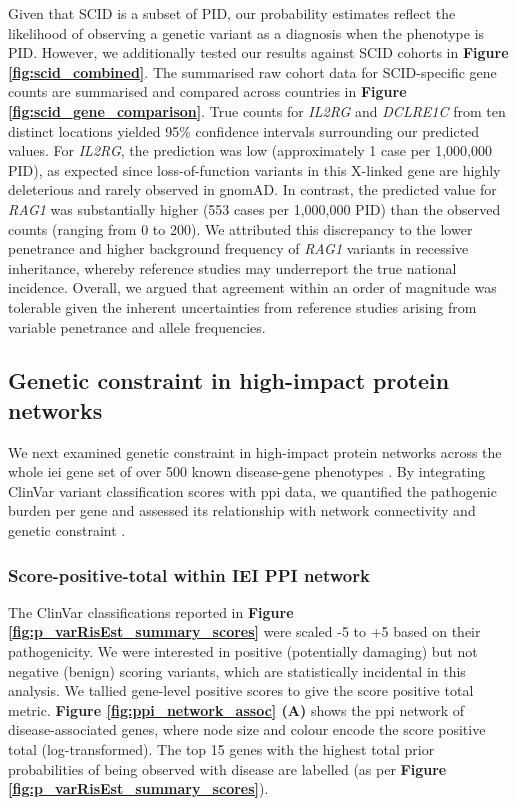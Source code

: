 Given that SCID is a subset of PID, our probability estimates reflect the likelihood of observing a genetic variant as a diagnosis when the phenotype is PID. However, we additionally tested our results against SCID cohorts in 
 \textbf{Figure \ref{fig:scid_combined}}.
 The summarised raw cohort data for SCID-specific gene counts are summarised and compared across countries in \textbf{Figure \ref{fig:scid_gene_comparison}}.
True counts for \textit{IL2RG} and \textit{DCLRE1C} from ten distinct locations yielded 95\% confidence intervals surrounding our predicted values. For \textit{IL2RG}, the prediction was low (approximately 1 case per 1,000,000 PID), as expected since loss-of-function variants in this X-linked gene are highly deleterious and rarely observed in gnomAD. In contrast, the predicted value for \textit{RAG1} was substantially higher (553 cases per 1,000,000 PID) than the observed counts (ranging from 0 to 200). We attributed this discrepancy to the lower penetrance and higher background frequency of \textit{RAG1} variants in recessive inheritance, whereby reference studies may underreport the true national incidence. Overall, we argued that agreement within an order of magnitude was tolerable given the inherent uncertainties from reference studies arising from variable penetrance and allele frequencies.

\FloatBarrier
\subsection{Genetic constraint in high-impact protein networks}

We next examined genetic constraint in high-impact protein networks across the whole \ac{iei} gene set of over 500 known disease-gene phenotypes \cite{tangye_human_2022}. By integrating ClinVar variant classification scores with \ac{ppi} data, we quantified the pathogenic burden per gene and assessed its relationship with network connectivity and genetic constraint
\cite{szklarczyk2025string, karczewski2020mutational}.

\subsubsection{Score-positive-total within IEI PPI network}

The ClinVar classifications reported in 
\textbf{Figure \ref{fig:p_varRisEst_summary_scores}} were scaled -5 to +5 based on their pathogenicity. 
We were interested in positive (potentially damaging) but not negative (benign) scoring variants, which are statistically incidental in this analysis. 
We tallied gene-level positive scores to give the score positive total metric. 
\textbf{Figure \ref{fig:ppi_network_assoc} (A)} shows the \ac{ppi} network of disease-associated genes, where node size and colour encode the score positive total (log-transformed). 
The top 15 genes with the highest total prior probabilities of being observed with disease are labelled (as per \textbf{Figure \ref{fig:p_varRisEst_summary_scores}}).

